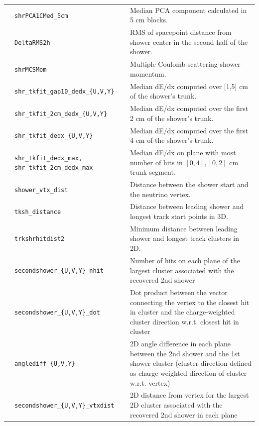 \begin{table}[ht]
\begin{tabular}{ m{} | m{} | m{}  }
\multicolumn{1}{l|}{} & \texttt{shrPCA1CMed\_5cm} & Median PCA component calculated in 5 cm blocks.  \\ \cline{2-3}
\multicolumn{1}{l|}{} & \texttt{DeltaRMS2h} & RMS of spacepoint distance from shower center in the second half of the shower.  \\ \cline{2-3}
\multicolumn{1}{l|}{} & \texttt{shrMCSMom} & Multiple Coulomb scattering shower momentum.  \\ 
\hline
\multicolumn{1}{l|}{} & \texttt{shr\_tkfit\_gap10\_dedx\_\{U,V,Y\}}  & Median dE/dx computed over [1,5] cm of the shower’s  trunk. \\ \cline{2-3}
\multicolumn{1}{l|}{} & \texttt{shr\_tkfit\_2cm\_dedx\_\{U,V,Y\}}  & Median dE/dx computed  over  the first 2 cm of the shower’s  trunk. \\ \cline{2-3}
\parbox[t]{2mm}{}  & \texttt{shr\_tkfit\_dedx\_\{U,V,Y\}}  & Median dE/dx computed  over  the first 4 cm of the shower’s  trunk. \\ 
 & \texttt{shr\_tkfit\_dedx\_max, shr\_tkfit\_2cm\_dedx\_max}  & Median dE/dx on plane with most number of hits in $[0,4], [0,2]$ cm trunk segment. \\ 
 & \texttt{shower\_vtx\_dist} & Distance between the shower start and the neutrino vertex.\\ 
  & \texttt{tksh\_distance}  & Distance between leading shower and longest track start points in 3D.\\  
  & \texttt{trkshrhitdist2}  & Minimum distance between leading shower and longest track clusters in 2D.\\  
\hline
{} & \texttt{secondshower\_\{U,V,Y\}\_nhit} & Number of hits on each plane of the largest cluster associated with the  recovered 2nd shower  \\  
\parbox[t]{2mm}{}  & \texttt{secondshower\_\{U,V,Y\}\_dot} &  Dot product between the vector connecting the vertex to the closest hit in cluster and the charge-weighted cluster direction w.r.t. closest hit in cluster \\  
 & \texttt{anglediff\_\{U,V,Y\}} & 2D angle difference in each plane between the 2nd shower and the 1st shower cluster  (cluster direction defined as charge-weighted direction of cluster w.r.t. vertex) \\ 
 & \texttt{secondshower\_\{U,V,Y\}\_vtxdist} & 2D distance from vertex for the largest 2D cluster associated with the recovered 2nd shower in each plane \\ 
\hline
\end{tabular}
\label{tab:variableSummary}
\end{table}

